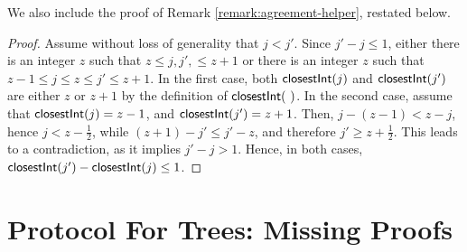 We also include the proof of Remark \ref{remark:agreement-helper}, restated below.
\AgrementHelper*
\begin{proof}
    Assume without loss of generality that $j < j'$. Since $j' - j \le 1$, either there is an integer $z$ such that $z \leq j, j', \leq z + 1$ or there is an integer $z$ such that $z - 1 \leq j \leq z \leq j' \leq z + 1$. In the first case, both $\textsf{closestInt}(j)$ and $\textsf{closestInt}(j')$ are either $z$ or $z + 1$ by the definition of $\textsf{closestInt}(\ )$. In the second case, assume that $\textsf{closestInt}(j) = z - 1$, and $\textsf{closestInt}(j') = z + 1$. Then, $j - (z - 1) < z - j$, hence $j < z - \frac{1}{2}$,
    while $(z + 1) - j' \leq j' - z$, and therefore $j' \geq z + \frac{1}{2}$. This leads to a contradiction, as it implies $j' - j > 1$. Hence, in both cases, $\textsf{closestInt}(j') - \textsf{closestInt}(j) \leq 1$.
\end{proof}












\section{Protocol For Trees: Missing Proofs} \label{appendix:trees}

